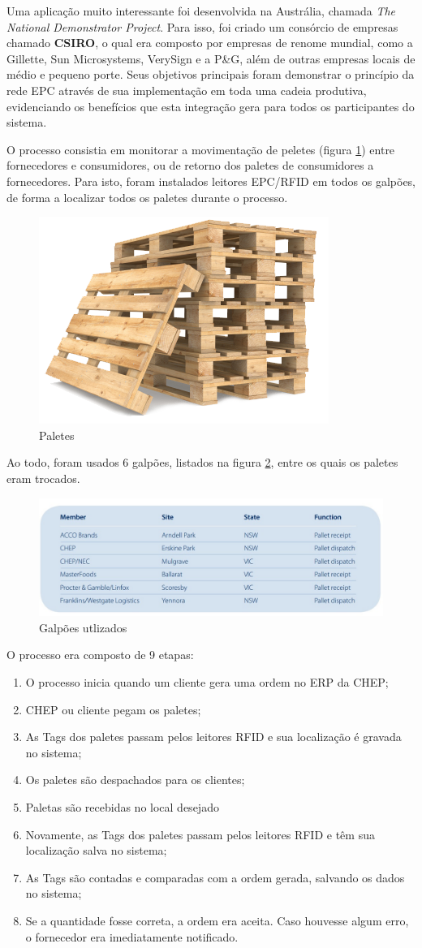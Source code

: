 	Uma aplicação muito interessante foi desenvolvida na Austrália, chamada \textit{The National Demonstrator Project}. Para isso, foi criado um consórcio de empresas chamado \textbf{CSIRO}, o qual era composto por empresas de renome mundial, como a Gillette, Sun Microsystems, VerySign e a P\&G, além de outras empresas locais de médio e pequeno porte. Seus objetivos principais foram demonstrar o princípio da rede EPC através de sua implementação em toda uma cadeia produtiva, evidenciando os benefícios que esta integração gera para todos os participantes do sistema. 
	
	O processo consistia em monitorar a movimentação de peletes (figura \ref{fig:palete}) entre fornecedores e consumidores, ou de retorno dos paletes de consumidores a fornecedores. Para isto, foram instalados leitores EPC/RFID em todos os galpões, de forma a localizar todos os paletes durante o processo.
	
	\begin{figure}[h!]
		\centering
		\includegraphics[width=0.2\linewidth]{pallet}
		\caption{Paletes}
		\label{fig:palete}
	\end{figure}

	Ao todo, foram usados 6 galpões, listados na figura \ref{fig:sites}, entre os quais os paletes eram trocados.
	
	\begin{figure}[h!]
		\centering
		\includegraphics[width=0.6\linewidth]{sites}
		\caption{Galpões utlizados}
		\label{fig:sites}
	\end{figure}
		
	 
	O processo era composto de 9 etapas:
	\begin{enumerate}
		\item O processo inicia quando um cliente gera uma ordem no ERP da CHEP;  
		\item CHEP ou cliente pegam os paletes;
		\item As Tags dos paletes passam pelos leitores RFID e sua localização é gravada no sistema;
		\item Os paletes são despachados para os clientes;
		\item Paletas são recebidas no local desejado
		\item Novamente, as Tags dos paletes passam pelos leitores RFID e têm sua localização salva no sistema;
		\item As Tags são contadas e comparadas com a ordem gerada, salvando os dados no sistema;
		\item Se a quantidade fosse correta, a ordem era aceita. Caso houvesse algum erro, o fornecedor era imediatamente notificado.
	\end{enumerate}	
	
